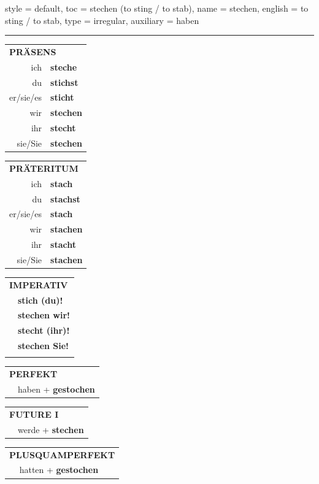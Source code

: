 \begin{verbentry}{
  style = {default},
  toc = {stechen (to sting / to stab)},
  name = {stechen},
  english = {to sting / to stab},
  type = {irregular},
  auxiliary = {haben}
}
 
    
     \vspace{5pt}

    \hrule
    
    \vspace{5pt}

  \begin{tabular}{rl}
     \multicolumn{2}{l}{\textbf{PRÄSENS} }\\
    ich & \textbf{steche}\\
    du & \textbf{stichst}\\
    er/sie/es & \textbf{sticht}\\
    wir & \textbf{stechen}\\
    ihr & \textbf{stecht}\\
    sie/Sie & \textbf{stechen}\\
  \end{tabular}
  \hfill
     \begin{tabular}{rl}
    \multicolumn{2}{l}{\textbf{PRÄTERITUM} }\\
    ich & \textbf{stach}\\
    du & \textbf{stachst}\\
    er/sie/es & \textbf{stach}\\
    wir & \textbf{stachen}\\
    ihr & \textbf{stacht}\\
    sie/Sie & \textbf{stachen}\\
  \end{tabular}
  \hfill
  \begin{tabular}{rl}
     \multicolumn{2}{l}{\textbf{IMPERATIV} }\\
   & \textbf{stich (du)!}\\
   & \textbf{stechen wir!}\\
   & \textbf{stecht (ihr)!}\\
   & \textbf{stechen Sie!}\\
   & \vspace{10pt}
  \end{tabular}

    \vspace{10pt}

 \begin{tabular}{rl}
     \multicolumn{2}{l}{\textbf{PERFEKT}}\\
   & haben + \textbf{gestochen}\\
  \end{tabular}
\hfill
   \begin{tabular}{rl}
    \multicolumn{2}{l}{\textbf{FUTURE I} }\\
   & werde + \textbf{stechen}\\
  \end{tabular}
\hfill
   \begin{tabular}{rl}
      \multicolumn{2}{l}{\textbf{PLUSQUAMPERFEKT}}\\
   & hatten + \textbf{gestochen}\\
  \end{tabular}


\end{verbentry}
